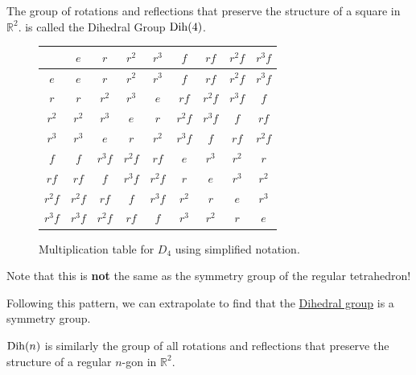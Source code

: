   \begin{example}
    \label{ex:dihedral-group-of-order-8}
    The group of rotations and reflections that preserve the structure of a square in $\mathbb{R}^2$. is called the Dihedral Group $\operatorname{Dih}(4)$. 

    \begin{figure}[H]
      \centering 
      \begin{tabular}{|c|c|c|c|c|c|c|c|c|}
        \hline
        & $e$ & $r$ & $r^2$ & $r^3$ & $f$ & $rf$ & $r^2f$ & $r^3f$ \\
        \hline
        $e$ & $e$ & $r$ & $r^2$ & $r^3$ & $f$ & $rf$ & $r^2f$ & $r^3f$ \\
        \hline
        $r$ & $r$ & $r^2$ & $r^3$ & $e$ & $rf$ & $r^2f$ & $r^3f$ & $f$ \\
        \hline
        $r^2$ & $r^2$ & $r^3$ & $e$ & $r$ & $r^2f$ & $r^3f$ & $f$ & $rf$ \\
        \hline
        $r^3$ & $r^3$ & $e$ & $r$ & $r^2$ & $r^3f$ & $f$ & $rf$ & $r^2f$ \\
        \hline
        $f$ & $f$ & $r^3f$ & $r^2f$ & $rf$ & $e$ & $r^3$ & $r^2$ & $r$ \\
        \hline
        $rf$ & $rf$ & $f$ & $r^3f$ & $r^2f$ & $r$ & $e$ & $r^3$ & $r^2$ \\
        \hline
        $r^2f$ & $r^2f$ & $rf$ & $f$ & $r^3f$ & $r^2$ & $r$ & $e$ & $r^3$ \\
        \hline
        $r^3f$ & $r^3f$ & $r^2f$ & $rf$ & $f$ & $r^3$ & $r^2$ & $r$ & $e$ \\
        \hline
      \end{tabular}
      \caption{Multiplication table for $D_4$ using simplified notation.} 
      \label{fig:square_d4_simplified}
    \end{figure}

    Note that this is \textbf{not} the same as the symmetry group of the regular tetrahedron! 
  \end{example} 

  Following this pattern, we can extrapolate to find that the \hyperref[def:dihedral-group]{Dihedral group} is a symmetry group. 

  \begin{theorem}
    \label{thm:dihedral-groups-as-symmetry-groups}
    $\operatorname{Dih}(n)$ is similarly the group of all rotations and reflections that preserve the structure of a regular $n$-gon in $\mathbb{R}^2$. 
  \end{theorem}

